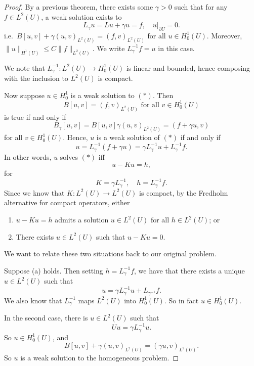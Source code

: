 \documentclass[a4paper]{article}
\begin{document}
\begin{proof}
  By a previous theorem, there exists some $\gamma > 0$ such that for any $f \in L^2(U)$, a weak solution exists to
  \[
    L_\gamma u = Lu + \gamma u = f,\quad u|_{\partial U} = 0.
  \]
  i.e.\ $B[u, v] + \gamma (u, v)_{L^2(U)} = (f, v)_{L^2(U)}$ for all $u \in H_0^1(U)$. Moreover, $\|u\|_{H^1(U)} \leq C \|f\|_{L^2(U)}$. We write $L_\gamma^{-1}f = u$ in this case.

  We note that $L_\gamma^{-1} : L^2(U) \to H_0^1(U)$ is linear and bounded, hence composing with the inclusion to $L^2(U)$ is compact.

  Now suppose $u \in H_0^1$ is a weak solution to $(*)$. Then
  \[
    B[u, v] = (f, v)_{L^2(U)} \text{ for all }v \in H_0^1(U)
  \]
  is true if and only if
  \[
    B_\gamma[u, v] = B[u, v] \gamma(u, v)_{L^2(U)} = (f + \gamma u, v)
  \]
  for all $v \in H_0^1(U)$. Hence, $u$ is a weak solution of $(*)$ if and only if
  \[
    u = L_\gamma^{-1}(f + \gamma u) = \gamma L_\gamma^{-1} u + L_\gamma^{-1} f.
  \]
  In other words, $u$ solves $(*)$ iff
  \[
    u - Ku = h,
  \]
  for
  \[
    K = \gamma L_\gamma^{-1},\quad h = L_\gamma^{-1} f.
  \]
  Since we know that $K: L^2(U) \to L^2(U)$ is compact, by the Fredholm alternative for compact operators, either
  \begin{enumerate}
    \item $u - Ku = h$ admits a solution $u \in L^2(U)$ for all $h \in L^2(U)$; or
    \item There exists $u \in L^2(U)$ such that $u - Ku = 0$.
  \end{enumerate}
  We want to relate these two situations back to our original problem.

  Suppose (a) holds. Then setting $h = L_\gamma^{-1} f$, we have that there exists a unique $u \in L^2(U)$ such that
  \[
    u = \gamma L_\gamma^{-1} u + L_{\gamma^{-1}} f.
  \]
  We also know that $L_\gamma^{-1}$ maps $L^2(U)$ into $H_0^1(U)$. So in fact $u \in H_0^1(U)$.

  In the second case, there is $u \in L^2(U)$ such that
  \[
    Uu = \gamma L_\gamma^{-1} u.
  \]
  So $u \in H_0^1(U)$, and
  \[
    B[u, v] + \gamma (u, v)_{L^2(U)} = (\gamma u, v)_{L^2(U)}.
  \]
  So $u$ is a weak solution to the homogeneous problem.


\end{proof}
\end{document}
